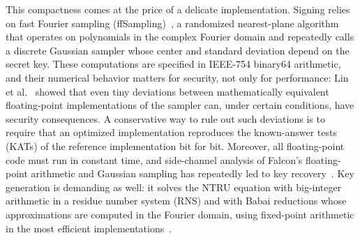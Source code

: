 This compactness comes at the price of a delicate implementation.
Signing relies on fast Fourier sampling (ffSampling)~\cite{DP16,Falcon}, a
randomized nearest-plane algorithm that operates on polynomials in the complex
Fourier domain and repeatedly calls a discrete Gaussian sampler whose center
and standard deviation depend on the secret key.
These computations are specified in IEEE-754 binary64 arithmetic, and their
numerical behavior matters for security, not only for performance:
Lin et al.~\cite{LTYZ25} showed that even tiny deviations between
mathematically equivalent floating-point implementations of the sampler can,
under certain conditions, have security consequences.
A conservative way to rule out such deviations is to require that an
optimized implementation reproduces the known-answer tests (KATs) of the
reference implementation bit for bit.
Moreover, all floating-point code must run in constant time, and side-channel
analysis of Falcon's floating-point arithmetic and Gaussian sampling has
repeatedly led to key recovery~\cite{KA21,GMRR22,ZLYW23}.
Key generation is demanding as well: it solves the NTRU equation with
big-integer arithmetic in a residue number system (RNS) and with Babai
reductions whose approximations are computed in the Fourier domain, using
fixed-point arithmetic in the most efficient
implementations~\cite{Pornin23kg,Pornin25kg}.

